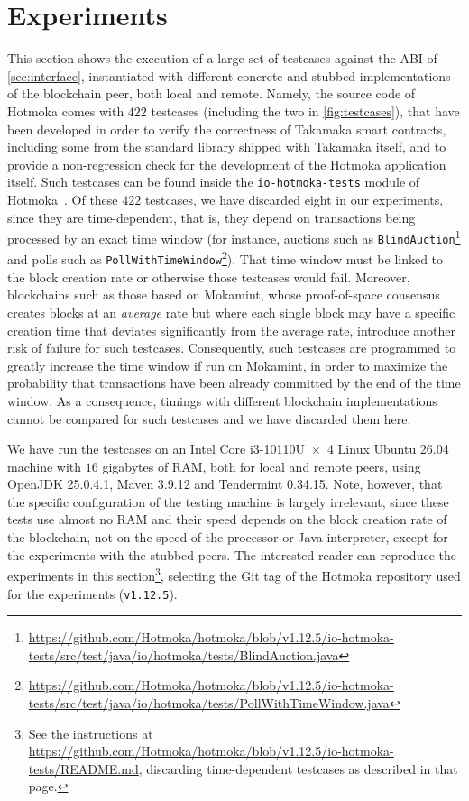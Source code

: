 \section{Experiments}\label{sec:experiments}

This section shows the execution of a large set of testcases
against the ABI of \cref{sec:interface}, instantiated
with different concrete and stubbed implementations of the blockchain peer, both
local and remote. Namely, the source code of Hotmoka
comes with $422$ testcases (including the two in \cref{fig:testcases}),
that have been developed in order to
verify the correctness of Takamaka smart contracts, including some from the standard
library shipped with Takamaka itself, and to provide a non-regression check
for the development of the Hotmoka application itself.
Such testcases can be found inside the \texttt{io-hotmoka-tests} module
of Hotmoka~\citep{hotmokacode}.
Of these $422$ testcases, we have discarded eight in our experiments,
since they are time-dependent, that is, they
depend on transactions being processed by an exact time window (for instance,
auctions such as \texttt{BlindAuction}\footnote{\url{https://github.com/Hotmoka/hotmoka/blob/v1.12.5/io-hotmoka-tests/src/test/java/io/hotmoka/tests/BlindAuction.java}}
and polls such as \texttt{PollWithTimeWindow}\footnote{\url{https://github.com/Hotmoka/hotmoka/blob/v1.12.5/io-hotmoka-tests/src/test/java/io/hotmoka/tests/PollWithTimeWindow.java}}).
That time window must be linked to the block creation rate or otherwise those testcases would fail.
Moreover, blockchains such as those based on Mokamint, whose
proof-of-space consensus creates blocks at an \emph{average} rate but where each single block
may have a specific creation time that deviates significantly from the average rate,
introduce another risk of failure for such testcases.
Consequently, such testcases are programmed to greatly increase the time window if run on Mokamint,
in order to maximize the probability that transactions have been already committed by the end of the time window.
As a consequence, timings with different blockchain implementations cannot be compared for such testcases and
we have discarded them here.

We have run the testcases on an Intel Core i3-10110U\ $\times$\ 4
Linux Ubuntu 26.04 machine
with $16$ gigabytes of RAM, both for local and remote peers,
using OpenJDK 25.0.4.1, Maven 3.9.12 and Tendermint 0.34.15.
Note, however, that the specific configuration of the testing machine
is largely irrelevant, since these tests use almost no RAM and their speed depends on the
block creation rate of the blockchain, not on the speed of the processor or Java interpreter,
except for the experiments with the stubbed peers.
The interested reader can reproduce
the experiments in this section\footnote{See the instructions at
\url{https://github.com/Hotmoka/hotmoka/blob/v1.12.5/io-hotmoka-tests/README.md},
discarding time-dependent testcases as described in that page.},
selecting the Git tag of the Hotmoka
repository used for the experiments (\texttt{v1.12.5}).

